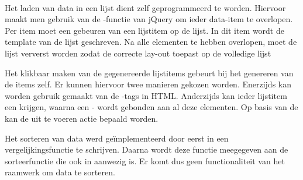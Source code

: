 \begin{table}[H]
\centering
{}
\caption{Gebruik voor }
\label{tabel:evaluatie-gebruik-lijsten}
\end{table}

\paragraph{\jqm}
Het laden van data in een lijst dient zelf geprogrammeerd te worden.
Hiervoor maakt men gebruik van de -functie van jQuery om ieder data-item te overlopen.
Per item moet een  gebeuren van een lijstitem op de lijst.
In dit item wordt de template van de lijst geschreven.
Na alle elementen te hebben overlopen, moet de lijst ververst worden zodat \jqm{} de correcte lay-out toepast op de volledige lijst

Het klikbaar maken van de gegenereerde lijstitems gebeurt bij het genereren van de items zelf.
Er kunnen hiervoor twee manieren gekozen worden.
Enerzijds kan worden gebruik gemaakt van de -tags in HTML.
Anderzijds kan ieder lijstitem een  krijgen, waarna een -  wordt gebonden aan al deze elementen.
Op basis van de  kan de uit te voeren actie bepaald worden.

Het sorteren van data werd geïmplementeerd door eerst in \js{} een vergelijkingsfunctie te schrijven.
Daarna wordt deze functie meegegeven aan de sorteerfunctie die ook in \js{} aanwezig is.
Er komt dus geen functionaliteit van het raamwerk om data te sorteren.

